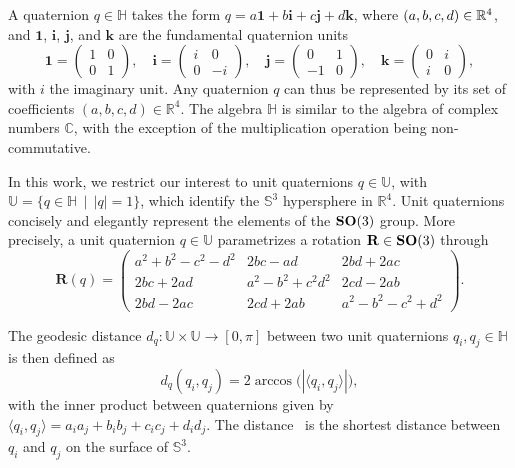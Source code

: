 A quaternion $q\in\mathbb{H}$ takes the form
$q =  a\boldsymbol{1} + b\boldsymbol{i} + c\boldsymbol{j} + d\boldsymbol{k}$,
where $(a,b,c,d) \in \mathbb{R}^4$, and $\boldsymbol{1}$, $\boldsymbol{i}$, $\boldsymbol{j}$, and $\boldsymbol{k}$ are the fundamental quaternion units
\begin{equation*}
    \boldsymbol{1} = \begin{pmatrix} 1 & 0 \\ 0 & 1 \end{pmatrix}, \quad
    \boldsymbol{i} = \begin{pmatrix} i & 0 \\ 0 & -i \end{pmatrix}, \quad
    \boldsymbol{j} = \begin{pmatrix} 0 & 1 \\ -1 & 0 \end{pmatrix}, \quad
    \boldsymbol{k} = \begin{pmatrix} 0 & i \\ i & 0 \end{pmatrix},
\end{equation*}
with $i$ the imaginary unit.
Any quaternion $q$ can thus be represented by its set of coefficients $(a,b,c,d)\in\mathbb{R}^4$.
The algebra $\mathbb{H}$ is similar to the algebra of complex numbers $\mathbb{C}$, with the exception of the multiplication operation being non-commutative.

In this work, we restrict our interest to unit quaternions $q\in\mathbb{U}$, with  $\mathbb{U}=\big\{q\in\mathbb{H} \; \, | \; \,\lvert q \rvert =1\big\}$, which identify the $\mathbb{S}^3$ hypersphere in  $\mathbb{R}^4$.
Unit quaternions concisely and elegantly represent the elements of the $\mathrm{\mathbf{SO}}(3)$ group.
More precisely, a unit quaternion $q\in\mathbb{U}$ parametrizes a rotation $\mathbf{R}\in\mathrm{\mathbf{SO}}(3)$ through
\begin{equation*}
    \mathbf{R}(q) =\begin{pmatrix}
    a^2+b^2-c^2-d^2 & 2bc-ad & 2bd+2ac  \\
    2bc+2ad & a^2-b^2+c^2d^2 & 2cd-2ab \\
    2bd-2ac & 2cd+2ab & a^2-b^2-c^2+d^2
    \end{pmatrix}.
\end{equation*}

The geodesic distance $d_q:\mathbb{U}\times\mathbb{U}\rightarrow [0,\pi]$ between two unit quaternions $q_i, q_j\in\mathbb{H}$ is then defined as
\begin{equation}
    d_q(q_i, q_j) = 2 \arccos \big(| \langle q_i, q_j \rangle| \big),
    \label{eqn:distance:orientations}
\end{equation}
with the inner product between quaternions given by $\langle q_i, q_j \rangle = a_ia_j+b_ib_j+c_ic_j+d_id_j$.
The distance~ is the shortest distance between $q_i$ and $q_j$ on the surface of $\mathbb{S}^3$.


